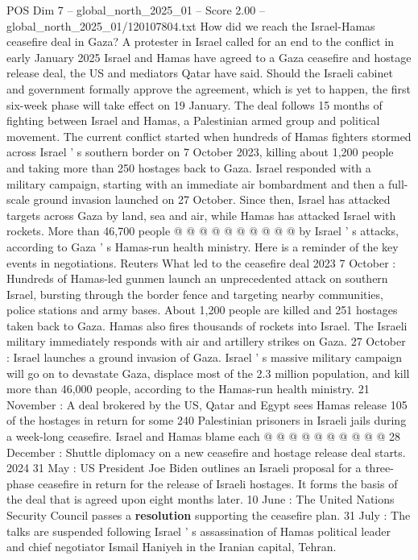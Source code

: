 \begin{textsample}{POS Dim 7 – global\_north\_2025\_01 – Score 2.00 – global\_north\_2025\_01/120107804.txt}  \label{ex:f7_pos_397}
How did we reach the Israel-Hamas ceasefire deal in Gaza?
A protester in Israel called for an end to the conflict in early January 2025 Israel and Hamas have agreed to a Gaza ceasefire and hostage release deal, the US and mediators Qatar have said.
Should the Israeli cabinet and government formally approve the agreement, which is yet to happen, the first six-week phase will take effect on 19 January.
The deal follows 15 months of fighting between Israel and Hamas, a Palestinian armed group and political movement.
The current conflict started when hundreds of Hamas fighters stormed across Israel ' s southern border on 7 October 2023, killing about 1,200 people and taking more than 250 hostages back to Gaza.
Israel responded with a military campaign, starting with an immediate air bombardment and then a full-scale ground invasion launched on 27 October.
Since then, Israel has attacked targets across Gaza by land, sea and air, while Hamas has attacked Israel with rockets.
More than 46,700 people @ @ @ @ @ @ @ @ @ @ by Israel ' s attacks, according to Gaza ' s Hamas-run health ministry.
Here is a reminder of the key events in negotiations.
Reuters What led to the ceasefire deal 2023 7 October : Hundreds of Hamas-led gunmen launch an unprecedented attack on southern Israel, bursting through the border fence and targeting nearby communities, police stations and army bases.
About 1,200 people are killed and 251 hostages taken back to Gaza.
Hamas also fires thousands of rockets into Israel.
The Israeli military immediately responds with air and artillery strikes on Gaza. 27 October : Israel launches a ground invasion of Gaza.
Israel ' s massive military campaign will go on to devastate Gaza, displace most of the 2.3 million population, and kill more than 46,000 people, according to the Hamas-run health ministry. 21 November : A deal brokered by the US, Qatar and Egypt sees Hamas release 105 of the hostages in return for some 240 Palestinian prisoners in Israeli jails during a week-long ceasefire.
Israel and Hamas blame each @ @ @ @ @ @ @ @ @ @ 28 December : Shuttle diplomacy on a new ceasefire and hostage release deal starts. 2024 31 May : US President Joe Biden outlines an Israeli proposal for a three-phase ceasefire in return for the release of Israeli hostages.
It forms the basis of the deal that is agreed upon eight months later. 10 June : The United Nations Security Council passes a \textbf{resolution} supporting the ceasefire plan. 31 July : The talks are suspended following Israel ' s assassination of Hamas political leader and chief negotiator Ismail Haniyeh in the Iranian capital, Tehran.

\end{textsample}

